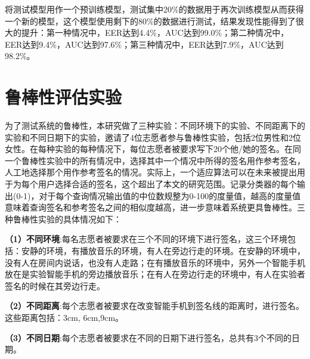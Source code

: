将测试模型用作一个预训练模型，测试集中20\%的数据用于再次训练模型从而获得一个新的模型，这个模型使用剩下的80\%的数据进行测试，结果发现性能得到了很大的提升：第一种情况中，EER达到4.4\%，AUC达到99.0\%；第二种情况中，EER达到9.4\%，AUC达到97.6\%；第三种情况中，EER达到7.9\%，AUC达到98.2\%。

\section{鲁棒性评估实验}
\label{sec:robustness-experiment}
为了测试系统的鲁棒性，本研究做了三种实验：不同环境下的实验、不同距离下的实验和不同日期下的实验，邀请了4位志愿者参与鲁棒性实验，包括2位男性和2位女性。在每种实验的每种情况下，每位志愿者被要求写下20个他/她的签名。在同一个鲁棒性实验中的所有情况中，选择其中一个情况中所得的签名用作参考签名，人工地选择那个用作参考签名的情况。实际上，一个适应算法可以在未来被提出用于为每个用户选择合适的签名，这个超出了本文的研究范围。记录分类器的每个输出(0-1)，对于每个查询情况输出值的中位数规整为0-100的度量值，越高的度量值意味着查询签名和参考签名之间的相似度越高，进一步意味着系统更具鲁棒性。三种鲁棒性实验的具体情况如下：

\textbf{（1）不同环境}:每名志愿者被要求在三个不同的环境下进行签名，这三个环境包括：安静的环境，有播放音乐的环境，有人在旁边行走的环境。在安静的环境中，没有人在房间内说话，也没有人走路；在有播放音乐的环境中，另外一个智能手机放在是实验智能手机的旁边播放音乐；在有人在旁边行走的环境中，有人在实验者签名的时候在其旁边行走。

\textbf{（2）不同距离}:每个志愿者被要求在改变智能手机到签名线的距离时，进行签名。这些距离包括：3cm, 6cm,9cm。

\textbf{（3）不同日期}:每个志愿者被要求在不同的日期下进行签名，总共有3个不同的日期。


